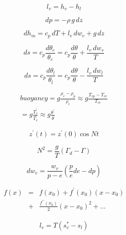 \documentclass[12pt]{article}
\begin{document}
\begin{multicols}{2}
\begin{equation}
l_v = h_v - h_l
\end{equation}


\begin{equation}
dp = - \rho\,g\,dz
\end{equation}


\begin{equation}
\label{eq:moist}
  dh_m = c_p\,dT + l_v\,dw_v + g\,dz
\end{equation}

\begin{equation}
\label{eq:theta}
  ds = c_p \frac{d\theta_e}{\theta_e} = c_p \frac{d\theta}{\theta} + \frac{l_v\,dw_s}{T}
\end{equation}

\begin{equation}
  ds = c_p \frac{d\theta_l}{\theta_l} = c_p \frac{d\theta}{\theta} - \frac{l_v\,dw_l}{T}
\end{equation}

\begin{multline}
  buoyancy = g \frac{\rho_e - \rho_p}{\rho_e} \approx g \frac{T_{vp} - T_{ve}}{T_{ve}} \\
 = g \frac{T_v^\prime}{\overline{T_v}} \approx g \frac{\theta^\prime}{\overline{\theta}}
\end{multline}

\begin{equation}
  \label{eq:bv1}
  z^\prime(t) = z^\prime (0) \cos N t
\end{equation}

\begin{equation}
  \label{eq:bv2}
  N^2 = \frac{g}{T} ( \Gamma_d - \Gamma )
\end{equation}


\begin{equation}
  \label{eq:wdiff}
  d w_v = \frac{w_v}{p-e} \left ( \frac{p}{e} de - dp \right )
\end{equation}

\begin{eqnarray}
  \label{eq:taylor}
  f(x)  &=& f(x_0) + f^\prime(x_0)(x - x_0) \nonumber\\ 
        &+&  \frac{f^{\prime\prime}(x_0)}{2}(x-x_0)^2 +  \ldots
\end{eqnarray}

\begin{gather}
\label{eq:cc}
  l_v = T (s_v^* - s_l)
\end{gather}


\end{multicols}
\end{document}
